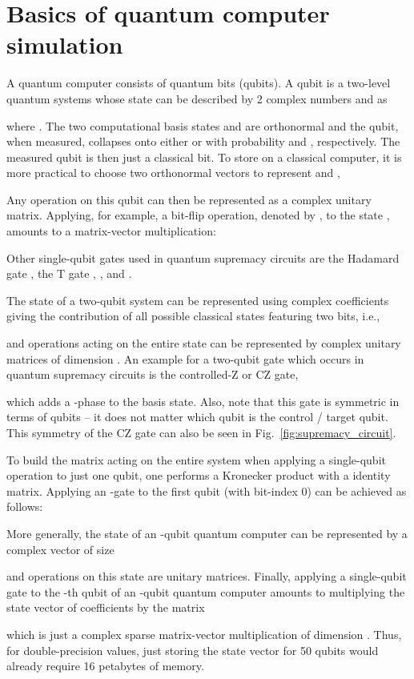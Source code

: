 \documentclass[sigconf]{acmart}
\begin{document}
\section{Basics of quantum computer simulation}
A quantum computer consists of quantum bits (qubits). A qubit is a two-level quantum systems whose state  can be described by 2 complex numbers  and  as

where . The two computational basis states  and  are orthonormal and the qubit, when measured, collapses onto either  or  with probability  and , respectively. The measured qubit is then just a classical bit. To store  on a classical computer, it is more practical to choose two orthonormal vectors to represent  and ,

Any operation on this qubit can then be represented as a complex unitary  matrix. Applying, for example, a bit-flip operation, denoted by , to the state , amounts to a matrix-vector multiplication:

Other single-qubit gates used in quantum supremacy circuits are the Hadamard gate , the T gate , , and .

The state of a two-qubit system  can be represented using  complex coefficients giving the contribution of all possible classical states featuring two bits, i.e.,

and operations acting on the entire state can be represented by complex unitary matrices of dimension . An example for a two-qubit gate which occurs in quantum supremacy circuits is the controlled-Z or CZ gate,

which adds a -phase to the  basis state. Also, note that this gate is symmetric in terms of qubits -- it does not matter which qubit is the control / target qubit. This symmetry of the CZ gate can also be seen in Fig.~\ref{fig:supremacy_circuit}.

To build the  matrix acting on the entire system when applying a single-qubit operation to just one qubit, one performs a Kronecker product with a  identity matrix. Applying an -gate to the first qubit (with bit-index 0) can be achieved as follows:

More generally, the state of an -qubit quantum computer can be represented by a complex vector of size 

and operations on this state are  unitary matrices. Finally, applying a single-qubit gate  to the -th qubit of an -qubit quantum computer amounts to multiplying the state vector of coefficients  by the matrix

which is just a complex sparse matrix-vector multiplication of dimension . Thus, for double-precision values, just storing the state vector for 50 qubits would already require 16 petabytes of memory.
\end{document}
